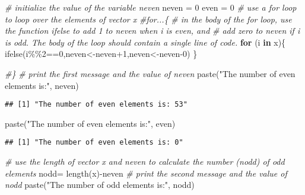 \documentclass[
]{article}
\newenvironment{Shaded}{\begin{snugshade}}{\end{snugshade}}
\newcommand{\CommentTok}[1]{\textcolor[rgb]{0.56,0.35,0.01}{\textit{#1}}}
\newcommand{\ControlFlowTok}[1]{\textcolor[rgb]{0.13,0.29,0.53}{\textbf{#1}}}
\newcommand{\DecValTok}[1]{\textcolor[rgb]{0.00,0.00,0.81}{#1}}
\newcommand{\FunctionTok}[1]{\textcolor[rgb]{0.00,0.00,0.00}{#1}}
\newcommand{\NormalTok}[1]{#1}
\newcommand{\OtherTok}[1]{\textcolor[rgb]{0.56,0.35,0.01}{#1}}
\newcommand{\SpecialCharTok}[1]{\textcolor[rgb]{0.00,0.00,0.00}{#1}}
\newcommand{\StringTok}[1]{\textcolor[rgb]{0.31,0.60,0.02}{#1}}
\begin{document}
\begin{Shaded}
\begin{Highlighting}[]
\CommentTok{\# initialize the value of the variable neven}
\NormalTok{neven }\OtherTok{=} \DecValTok{0}
\NormalTok{even }\OtherTok{=} \DecValTok{0}
\CommentTok{\# use a for loop to loop over the elements of vector x}
\CommentTok{\#for...\{}
  \CommentTok{\# in the body of the for loop, use the function ifelse to add 1 to neven when i is even, and }
  \CommentTok{\# add zero to neven if i is odd. The body of the loop should contain a single line of code.}
\ControlFlowTok{for}\NormalTok{ (i }\ControlFlowTok{in}\NormalTok{ x)\{}
  \FunctionTok{ifelse}\NormalTok{(i}\SpecialCharTok{\%\%}\DecValTok{2}\SpecialCharTok{==}\DecValTok{0}\NormalTok{,neven}\OtherTok{\textless{}{-}}\NormalTok{neven}\SpecialCharTok{+}\DecValTok{1}\NormalTok{,neven}\OtherTok{\textless{}{-}}\NormalTok{neven}\DecValTok{{-}0}\NormalTok{)}
\NormalTok{\}}

\CommentTok{\#\}}
\CommentTok{\# print the first message and the value of neven }
\FunctionTok{paste}\NormalTok{(}\StringTok{"The number of even elements is:"}\NormalTok{, neven)}
\end{Highlighting}
\end{Shaded}

\begin{verbatim}
## [1] "The number of even elements is: 53"
\end{verbatim}

\begin{Shaded}
\begin{Highlighting}[]
\FunctionTok{paste}\NormalTok{(}\StringTok{"The number of even elements is:"}\NormalTok{, even)}
\end{Highlighting}
\end{Shaded}

\begin{verbatim}
## [1] "The number of even elements is: 0"
\end{verbatim}

\begin{Shaded}
\begin{Highlighting}[]
\CommentTok{\# use the length of vector x and neven to calculate the number (nodd) of odd elements}
\NormalTok{nodd}\OtherTok{=} \FunctionTok{length}\NormalTok{(x)}\SpecialCharTok{{-}}\NormalTok{neven}
\CommentTok{\# print the second message and the value of nodd}
\FunctionTok{paste}\NormalTok{(}\StringTok{"The number of odd elements is:"}\NormalTok{, nodd)}
\end{Highlighting}
\end{Shaded}
\end{document}
